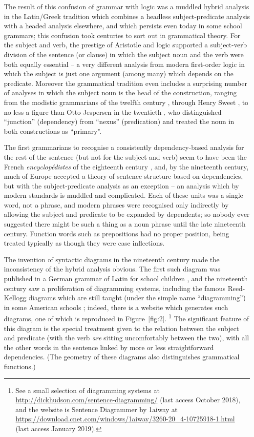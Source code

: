 \documentclass[output=paper
	        ,collection
	        ,collectionchapter
 	        ,biblatex
                ,babelshorthands
                ,newtxmath
                ,draftmode
                ,colorlinks, citecolor=brown
]{langscibook}
\begin{document}
The result of this confusion of grammar with logic was a muddled hybrid analysis in the Latin/Greek tradition which combines a headless subject-predicate analysis with a headed analysis elsewhere, and which persists even today in some school grammars; this confusion took centuries to sort out in grammatical theory. For the subject and verb, the prestige of Aristotle and logic supported a subject-verb division of the sentence (or clause) in which the subject noun and the verb were both equally essential – a very different analysis from modern first-order logic in which the subject is just one argument (among many) which depends on the predicate. Moreover the grammatical tradition even includes a surprising number of analyses in which the subject noun is the head of the construction, ranging from the modistic grammarians of the twelfth century \citep[83]{Robins1967}, through Henry Sweet \citep[17]{Sweet1891}, to no less a figure than Otto Jespersen in the twentieth \citep{Jespersen37a-u}, who distinguished ``junction'' (dependency) from ``nexus'' (predication) and treated the noun in both constructions as ``primary''.

The first grammarians to recognise a consistently dependency-based analysis for the rest of the sentence (but not for the subject and verb) seem to have been the French \emph{encyclopédistes} of the eighteenth century \citep{KahaneTBA}, and, by the nineteenth century, much of Europe accepted a theory of sentence structure based on dependencies, but with the subject-predicate analysis as an exception – an analysis which by modern standards is muddled and complicated. Each of these units was a single word, not a phrase, and modern phrases were recognised only indirectly by allowing the subject and predicate to be expanded by dependents; so nobody ever suggested there might be such a thing as a noun phrase until the late nineteenth century. Function words such as prepositions had no proper position, being treated typically as though they were case inflections.

The invention of syntactic diagrams in the nineteenth century made the inconsistency of the hybrid analysis obvious. The first such diagram was published in a German grammar of Latin for school children \citep{Billroth1832}, and the nineteenth century saw a proliferation of diagramming systems, including the famous Reed-Kellogg diagrams which are still taught (under the simple name ``diagramming'') in some American schools \citep{ReedKellog1890}; indeed, there is a website which generates such diagrams, one of which is reproduced in Figure~\ref{fig:2}.%
%
\footnote{See a small selection of diagramming systems at \url{http://dickhudson.com/sentence-diagramming/} (last access October 2018), and the website is Sentence Diagrammer by 1aiway at \url{https://download.cnet.com/windows/1aiway/3260-20_4-10725918-1.html} (last access January 2019).}
%
The significant feature of this diagram is the special treatment given to the relation between the subject and predicate (with the verb \emph{are} sitting uncomfortably between the two), with all the other words in the sentence linked by more or less straightforward dependencies. (The geometry of these diagrams also distinguishes grammatical functions.)
 
\end{document}
